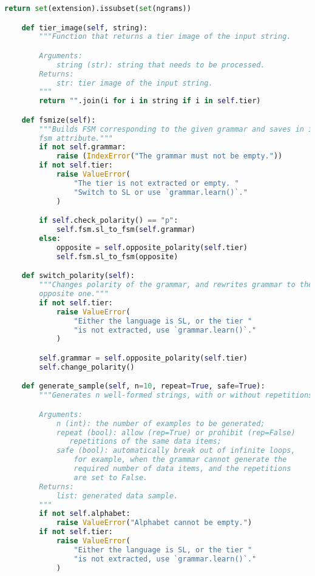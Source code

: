\begin{lstlisting}[language=Python]
        return set(extension).issubset(set(ngrams))

    def tier_image(self, string):
        """Function that returns a tier image of the input string.

        Arguments:
            string (str): string that needs to be processed.
        Returns:
            str: tier image of the input string.
        """
        return "".join(i for i in string if i in self.tier)

    def fsmize(self):
        """Builds FSM corresponding to the given grammar and saves in it the
        fsm attribute."""
        if not self.grammar:
            raise (IndexError("The grammar must not be empty."))
        if not self.tier:
            raise ValueError(
                "The tier is not extracted or empty. "
                "Switch to SL or use `grammar.learn()`."
            )

        if self.check_polarity() == "p":
            self.fsm.sl_to_fsm(self.grammar)
        else:
            opposite = self.opposite_polarity(self.tier)
            self.fsm.sl_to_fsm(opposite)

    def switch_polarity(self):
        """Changes polarity of the grammar, and rewrites grammar to the
        opposite one."""
        if not self.tier:
            raise ValueError(
                "Either the language is SL, or the tier "
                "is not extracted, use `grammar.learn()`."
            )

        self.grammar = self.opposite_polarity(self.tier)
        self.change_polarity()

    def generate_sample(self, n=10, repeat=True, safe=True):
        """Generates n well-formed strings, with or without repetitions.

        Arguments:
            n (int): the number of examples to be generated;
            repeat (bool): allow (rep=True) or prohibit (rep=False)
               repetitions of the same data items;
            safe (bool): automatically break out of infinite loops,
                for example, when the grammar cannot generate the
                required number of data items, and the repetitions
                are set to False.
        Returns:
            list: generated data sample.
        """
        if not self.alphabet:
            raise ValueError("Alphabet cannot be empty.")
        if not self.tier:
            raise ValueError(
                "Either the language is SL, or the tier "
                "is not extracted, use `grammar.learn()`."
            )


\end{lstlisting}
